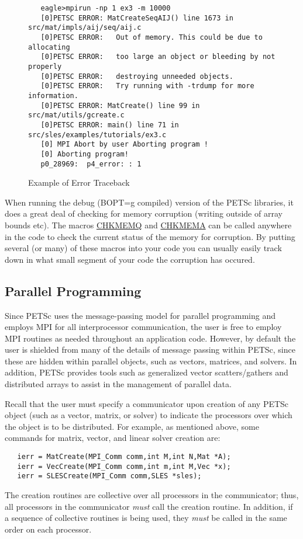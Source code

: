 \begin{figure}[H]
{\small
\begin{verbatim}
   eagle>mpirun -np 1 ex3 -m 10000
   [0]PETSC ERROR: MatCreateSeqAIJ() line 1673 in src/mat/impls/aij/seq/aij.c
   [0]PETSC ERROR:   Out of memory. This could be due to allocating
   [0]PETSC ERROR:   too large an object or bleeding by not properly
   [0]PETSC ERROR:   destroying unneeded objects.
   [0]PETSC ERROR:   Try running with -trdump for more information. 
   [0]PETSC ERROR: MatCreate() line 99 in src/mat/utils/gcreate.c  
   [0]PETSC ERROR: main() line 71 in src/sles/examples/tutorials/ex3.c  
   [0] MPI Abort by user Aborting program !
   [0] Aborting program!
   p0_28969:  p4_error: : 1
\end{verbatim}
}
\nobreak
\caption{Example of Error Traceback}
\label{fig:traceback}
\end{figure}

When running the debug (BOPT=g compiled) version of the PETSc libraries, it
does a great deal of checking for memory corruption (writing outside of 
array bounds etc). The macros \url{CHKMEMQ} and \url{CHKMEMA} can be called 
anywhere in the code to check the current status of the memory for corruption.
By putting several (or many) of these macros into your code you can usually 
easily track down in what small segment of your code the corruption has occured.

\subsection*{Parallel Programming}

Since PETSc uses the message-passing model for
parallel programming and employs MPI for all interprocessor
communication, the user is free to employ MPI routines as needed
throughout an application code.  However, by default the user is
shielded from many of the details of message passing within PETSc,
since these are hidden within parallel objects, such as vectors,
matrices, and solvers.  In addition, PETSc provides tools such as
generalized vector scatters/gathers and distributed arrays to assist
in the management of parallel data.

Recall that the user must specify a communicator upon creation of any
PETSc object (such as a vector, matrix, or solver) to indicate the
processors over which the object is to be distributed.  For example,
as mentioned above, some commands for matrix, vector, and linear solver
creation are:
\begin{verbatim}
   ierr = MatCreate(MPI_Comm comm,int M,int N,Mat *A);
   ierr = VecCreate(MPI_Comm comm,int m,int M,Vec *x);
   ierr = SLESCreate(MPI_Comm comm,SLES *sles); 
\end{verbatim}
The creation routines are collective over all processors in the
communicator; thus, all processors in the communicator {\em must}
call the creation routine.  In addition, if a sequence of
collective routines is being used, they {\em must} be called
in the same order on each processor.

